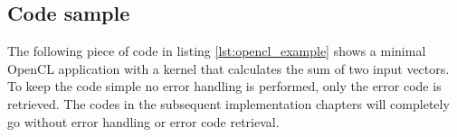 \subsection{Code sample}
\label{sec:code_sample}

The following piece of code in listing \ref{lst:opencl_example} shows a minimal OpenCL application with a kernel that calculates the sum of two input vectors. To keep the code simple no error handling is performed, only the error code is retrieved. The codes in the subsequent implementation chapters will completely go without error handling or error code retrieval.

\pagebreak



